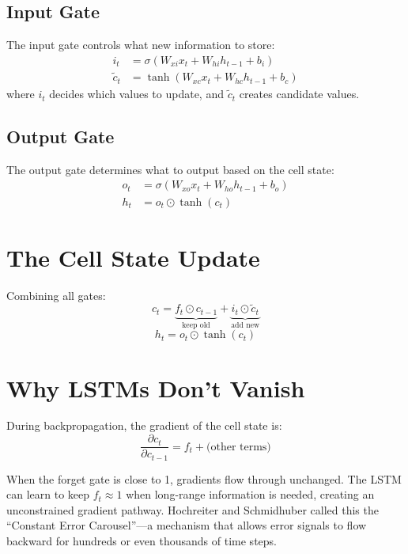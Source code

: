 \documentclass[12pt]{article}
\begin{document}
\subsection*{Input Gate}
The input gate controls what new information to store:
\begin{align}
    i_t &= \sigma(W_{xi} x_t + W_{hi} h_{t-1} + b_i) \\
    \tilde{c}_t &= \tanh(W_{xc} x_t + W_{hc} h_{t-1} + b_c)
\end{align}
where $i_t$ decides which values to update, and $\tilde{c}_t$ creates candidate values.

\subsection*{Output Gate}
The output gate determines what to output based on the cell state:
\begin{align}
    o_t &= \sigma(W_{xo} x_t + W_{ho} h_{t-1} + b_o) \\
    h_t &= o_t \odot \tanh(c_t)
\end{align}

\section*{The Cell State Update}
Combining all gates:
\begin{equation}
    c_t = \underbrace{f_t \odot c_{t-1}}_{\text{keep old}} + \underbrace{i_t \odot \tilde{c}_t}_{\text{add new}}
\end{equation}
\begin{equation}
    h_t = o_t \odot \tanh(c_t)
\end{equation}

\section*{Why LSTMs Don't Vanish}
During backpropagation, the gradient of the cell state is:
\begin{equation}
    \frac{\partial c_t}{\partial c_{t-1}} = f_t + \text{(other terms)}
\end{equation}

When the forget gate is close to 1, gradients flow through unchanged. The LSTM can learn to keep $f_t \approx 1$ when long-range information is needed, creating an unconstrained gradient pathway. Hochreiter and Schmidhuber called this the ``Constant Error Carousel''---a mechanism that allows error signals to flow backward for hundreds or even thousands of time steps.
\end{document}
